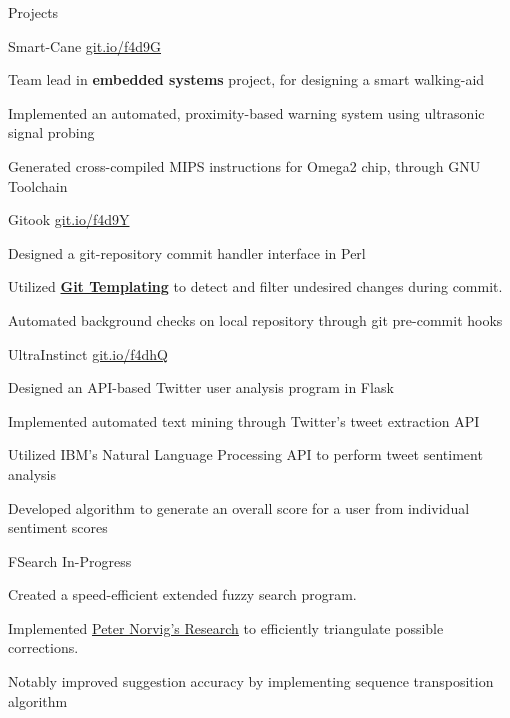 \documentclass{resume} %
\begin{document}

\begin{rSection}{Projects}

  \begin{rProjectSection}{Smart-Cane}
                         {{\href{https://git.io/f4d9G}{git.io/f4d9G}}}
  \item Team lead in \textbf{embedded systems} project, for designing a smart 
  walking-aid
  \item Implemented an automated, proximity-based warning system using
  ultrasonic signal probing
  \item Generated cross-compiled MIPS instructions for Omega2 chip, 
  through GNU Toolchain
  \end{rProjectSection}

  \begin{rProjectSection}{Gitook}
                         {{\href{https://git.io/f4d9Y}{git.io/f4d9Y}}}
  \item Designed a git-repository commit handler interface in Perl
  \item Utilized {\href{https://git-template.readthedocs.io/en/latest/}{\textbf{Git Templating}}} to detect and filter undesired
  changes during commit.
  \item Automated background checks on local repository through 
  git pre-commit hooks
  \end{rProjectSection}

  \begin{rProjectSection}{UltraInstinct}
                         {{\href{https://git.io/f4dhQ}{git.io/f4dhQ}}}
  \item Designed an API-based Twitter user analysis program in Flask
  \item Implemented automated text mining through Twitter's tweet 
  extraction API
  \item Utilized IBM's Natural Language Processing API to perform tweet sentiment analysis
  \item Developed algorithm to generate an overall score for a user from
  individual sentiment scores

  \end{rProjectSection}

  \begin{rProjectSection}{FSearch}
                         {In-Progress}
  \item Created a speed-efficient extended fuzzy search program.
	\item Implemented \href{http://norvig.com/mayzner.html}{\underline{Peter Norvig's Research}} to efficiently triangulate possible corrections.
	\item Notably improved suggestion accuracy by implementing sequence 
  transposition algorithm
  \end{rProjectSection}

\end{rSection}
\end{document}
